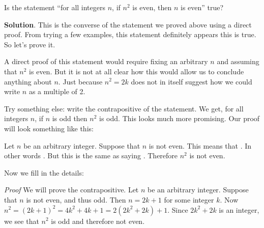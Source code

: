 \documentclass[11pt,]{book}
\makeatletter
\theoremstyle{ptxplainnotitle}
\theoremstyle{ptxplaintitle}
\renewcommand*{\proofname}{Proof}
\renewenvironment{proof}[1][\proofname]{\par
  \pushQED{\qed}%
  \normalfont \topsep6\p@\@plus6\p@\relax
  \trivlist
  \item\relax
    {\itshape
    #1\@addpunct{.}}\hspace\labelsep\ignorespaces
}{%
  \popQED\endtrivlist\@endpefalse
}
\theoremstyle{ptxdefinitionnotitle}
\theoremstyle{ptxdefinitiontitle}
\theoremstyle{ptxdefinitionnotitle}
\theoremstyle{ptxdefinitiontitle}
\theoremstyle{ptxdefinitionnotitle}
\theoremstyle{ptxdefinitiontitle}
\theoremstyle{ptxdefinitiontitlenonumber}
\theoremstyle{ptxdefinitiontitlenonumber}
\numberwithin{equation}{chapter}
\makeatother
\begin{document}
\begin{example}\label{example-65}
\hypertarget{p-2552}{}%
Is the statement ``for all integers \(n\), if \(n^2\) is even, then \(n\) is even'' true?%
\par\smallskip%
\noindent\textbf{Solution}.\hypertarget{solution-289}{}\quad%
\hypertarget{p-2553}{}%
This is the converse of the statement we proved above using a direct proof. From trying a few examples, this statement definitely appears this is true. So let's prove it.%
\par
\hypertarget{p-2554}{}%
A direct proof of this statement would require fixing an arbitrary \(n\) and assuming that \(n^2\) is even. But it is not at all clear how this would allow us to conclude anything about \(n\). Just because \(n^2 = 2k\) does not in itself suggest how we could write \(n\) as a multiple of 2.%
\par
\hypertarget{p-2555}{}%
Try something else: write the contrapositive of the statement. We get, for all integers \(n\), if \(n\) is odd then \(n^2\) is odd. This looks much more promising. Our proof will look something like this:%
\par
\hypertarget{p-2556}{}%
Let \(n\) be an arbitrary integer. Suppose that \(n\) is not even. This means that \textellipsis{}. In other words \textellipsis{}. But this is the same as saying \textellipsis{}. Therefore \(n^2\) is not even.%
\par
\hypertarget{p-2557}{}%
Now we fill in the details:%
\begin{proof}\hypertarget{proof-27}{}
\hypertarget{p-2558}{}%
We will prove the contrapositive. Let \(n\) be an arbitrary integer. Suppose that \(n\) is not even, and thus odd. Then \(n= 2k+1\) for some integer \(k\). Now \(n^2 = (2k+1)^2 = 4k^2 + 4k + 1 = 2(2k^2 + 2k) + 1\). Since \(2k^2 + 2k\) is an integer, we see that \(n^2\) is odd and therefore not even.%
\end{proof}
\end{example}
\end{document}
